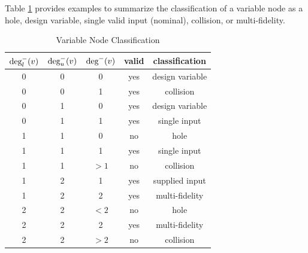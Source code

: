 Table \ref{t:variable node classification} provides examples to summarize the classification of a variable node as a hole, design variable, single valid input (nominal), collision, or multi-fidelity.

\begin{table}[htbp]
  \centering
  \caption{Variable Node Classification}
    \begin{tabular}{ccccc}
    \toprule
    $\textrm{deg}^-_l(v)$ & $\textrm{deg}^-_u(v)$ & $\textrm{deg}^-(v)$ & valid & classification \\
    \midrule
    0     & 0     & 0     & yes   & design variable \\
    0     & 0     & 1     & yes   & collision \\
    0     & 1     & 0     & yes   & design variable \\
    0     & 1     & 1     & yes   & single input \\
    1     & 1     & 0     & no    & hole \\
    1     & 1     & 1     & yes   & single input \\
    1     & 1     & $>1$ & no    & collision \\
    1     & 2     & 1     & yes   & supplied input \\
    1     & 2     & 2     & yes   & multi-fidelity \\
    2     & 2     & $<2$ & no    & hole \\
    2     & 2     & 2     & yes   & multi-fidelity \\
    2     & 2     & $>2$     & no   & collision \\
    \bottomrule
    \end{tabular}%
  \label{t:variable node classification}%
\end{table}%



